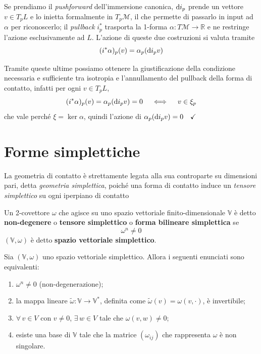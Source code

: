 Se prendiamo il \emph{pushforward} dell'immersione canonica, $\odif{i_p}$ prende un vettore $v \in T_p L$ e lo inietta formalmente in $T_p \mathcal{M}$, il che permette di passarlo in input ad $\alpha$ per riconoscerlo; il \emph{pullback} $i_p^*$ trasporta la 1-forma $\alpha : T\mathcal{M} \longrightarrow \mathbb{R}$ e ne restringe l'azione esclusivamente ad $L$. L'azione di queste due costruzioni si valuta tramite
\[
    (i^* \alpha )_p (v) = \alpha_p (\odif{i_p} v)
\]

Tramite queste ultime possiamo ottenere la giustificazione della condizione necessaria e sufficiente tra isotropia e l'annullamento del pullback della forma di contatto, infatti per ogni $v \in T_p L$,
\[
    (i^* \alpha )_p (v) = \alpha_p (\odif{i_p} v) = 0 \quad \iff \quad v \in \xi_p
\]
che vale perché $\xi = \ker \alpha$, quindi l'azione di $\alpha_p ( \odif{i_p}v) = 0 \quad \checkmark$

\section{Forme simplettiche}

La geometria di contatto è strettamente legata alla sua controparte su dimensioni pari, detta \emph{geometria simplettica}, poiché una forma di contatto induce un \emph{tensore simplettico} su ogni iperpiano di contatto

\begin{definition}
    Un 2-covettore $\omega$ che agisce su uno spazio vettoriale finito-dimensionale $\mathbb{V}$ è detto \textbf{non-degenere} o \textbf{tensore simplettico} o \textbf{forma bilineare simplettica} se
    \begin{equation*}
        \omega^n \neq 0 \tag*{Condizione di non-degenerazione}
    \end{equation*}
    $(\mathbb{V}, \omega)$ è detto \textbf{spazio vettoriale simplettico}.
\end{definition}

\begin{lemma}
    Sia $(\mathbb{V},\omega)$ uno spazio vettoriale simplettico. Allora i seguenti enunciati sono equivalenti:
    \begin{enumerate}
        \renewcommand{\theenumi}{\Roman{enumi}}
        \renewcommand{\labelenumi}{\theenumi)}
        \item $\omega^n \neq 0$ (non-degenerazione);
        \item la mappa lineare $\tilde{\omega}\colon \mathbb{V} \longrightarrow \mathbb{V}^*$, definita come
              $\tilde{\omega}(v) = \omega(v,\cdot)$, è invertibile;
        \item $\forall\, v \in V$ con $v \neq 0$, $\exists\, w \in V$ tale che $\omega(v,w) \neq 0$;
        \item esiste una base di $\mathbb{V}$ tale che la matrice $(\omega_{ij})$ che rappresenta $\omega$
              è non singolare.
    \end{enumerate}
\end{lemma}

